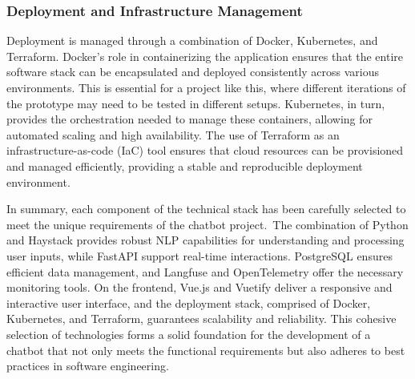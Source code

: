 \subsubsection{Deployment and Infrastructure Management}

Deployment is managed through a combination of Docker, Kubernetes, and Terraform.
Docker’s role in containerizing the application ensures that the entire software stack can be encapsulated and deployed
consistently across various environments.\autocite[cf.][p. 191]{openjaStudyingPracticesDeploying2022} This is essential
for a project like this, where different iterations of the prototype may need to be tested in different setups.
Kubernetes, in turn, provides the orchestration needed to manage these containers, allowing for automated scaling and
high availability.\autocite[cf.][pp. 2,7-8]{carrionKubernetesSchedulingTaxonomy2022} The use of Terraform as an
infrastructure-as-code (IaC) tool ensures that cloud resources can be provisioned and managed efficiently, providing a
stable and reproducible deployment environment.\autocite[cf.][p. 24]{n.EvaluatingDevopsTools2023}

\vspace{1cm}

In summary, each component of the technical stack has been carefully selected to meet the unique requirements of the
chatbot project.\ The combination of Python and Haystack provides robust NLP capabilities for understanding and
processing user inputs, while FastAPI support real-time interactions. PostgreSQL ensures efficient data management,
and Langfuse and OpenTelemetry offer the necessary monitoring tools. On the frontend, Vue.js and Vuetify deliver a
responsive and interactive user interface, and the deployment stack, comprised of Docker, Kubernetes, and Terraform,
guarantees scalability and reliability. This cohesive selection of technologies forms a solid foundation for the
development of a chatbot that not only meets the functional requirements but also adheres to best practices in software
engineering.
